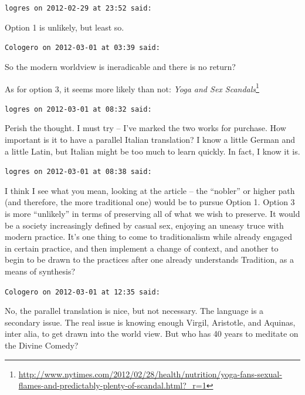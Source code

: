 \begin{footnotesize}
\begin{sffamily}
\texttt{logres on 2012-02-29 at 23:52 said:}

Option 1 is unlikely, but least so.

\hfill

\texttt{Cologero on 2012-03-01 at 03:39 said:}

So the modern worldview is ineradicable and there is no return?

As for option 3, it seems more likely than not: \textit{Yoga and Sex Scandals}\footnote{\url{http://www.nytimes.com/2012/02/28/health/nutrition/yoga-fans-sexual-flames-and-predictably-plenty-of-scandal.html?\_r=1}}

\hfill

\texttt{logres on 2012-03-01 at 08:32 said:}

Perish the thought. I must try -- I've marked the two works for purchase. How important is it to have a parallel Italian translation? I know a little German and a little Latin, but Italian might be too much to learn quickly. In fact, I know it is.

\hfill

\texttt{logres on 2012-03-01 at 08:38 said:}

I think I see what you mean, looking at the article -- the ``nobler'' or higher path (and therefore, the more traditional one) would be to pursue Option 1. Option 3 is more ``unlikely'' in terms of preserving all of what we wish to preserve. It would be a society increasingly defined by casual sex, enjoying an uneasy truce with modern practice. It's one thing to come to traditionalism while already engaged in certain practice, and then implement a change of context, and another to begin to be drawn to the practices after one already understands Tradition, as a means of synthesis?

\hfill

\texttt{Cologero on 2012-03-01 at 12:35 said:}

No, the parallel translation is nice, but not necessary. The language is a secondary issue. The real issue is knowing enough Virgil, Aristotle, and Aquinas, inter alia, to get drawn into the world view. But who has 40 years to meditate on the Divine Comedy?

\hfill

\end{sffamily}
\end{footnotesize}

